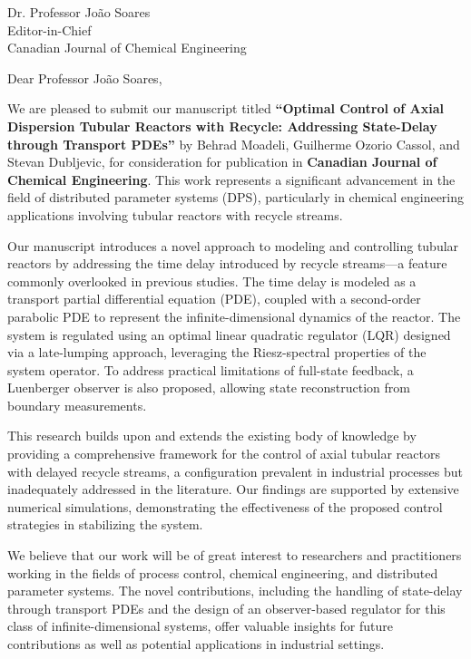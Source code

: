 \documentclass[11pt]{letter}
\begin{document}
\begin{letter}{Dr. Professor João Soares \\
Editor-in-Chief \\
Canadian Journal of Chemical Engineering}

\opening{Dear Professor João Soares,}

We are pleased to submit our manuscript titled \textbf{``Optimal Control of Axial Dispersion Tubular Reactors with Recycle: Addressing State-Delay through Transport PDEs''} by Behrad Moadeli, Guilherme Ozorio Cassol, and Stevan Dubljevic, for consideration for publication in \textbf{Canadian Journal of Chemical Engineering}. This work represents a significant advancement in the field of distributed parameter systems (DPS), particularly in chemical engineering applications involving tubular reactors with recycle streams.

Our manuscript introduces a novel approach to modeling and controlling tubular reactors by addressing the time delay introduced by recycle streams—a feature commonly overlooked in previous studies. The time delay is modeled as a transport partial differential equation (PDE), coupled with a second-order parabolic PDE to represent the infinite-dimensional dynamics of the reactor. The system is regulated using an optimal linear quadratic regulator (LQR) designed via a late-lumping approach, leveraging the Riesz-spectral properties of the system operator. To address practical limitations of full-state feedback, a Luenberger observer is also proposed, allowing state reconstruction from boundary measurements.

This research builds upon and extends the existing body of knowledge by providing a comprehensive framework for the control of axial tubular reactors with delayed recycle streams, a configuration prevalent in industrial processes but inadequately addressed in the literature. Our findings are supported by extensive numerical simulations, demonstrating the effectiveness of the proposed control strategies in stabilizing the system.

We believe that our work will be of great interest to researchers and practitioners working in the fields of process control, chemical engineering, and distributed parameter systems. The novel contributions, including the handling of state-delay through transport PDEs and the design of an observer-based regulator for this class of infinite-dimensional systems, offer valuable insights for future contributions as well as potential applications in industrial settings.


\end{letter}
\end{document}
